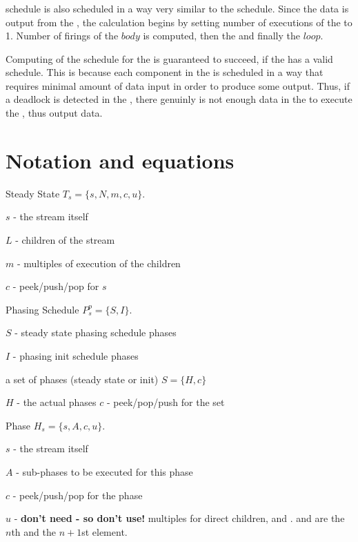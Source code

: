 \subsubsection{\feedbackloop}

{\feedbackloop} schedule is also scheduled in a way very similar to
the {\pipeline} schedule.  Since the data is output from the
{\splitter}, the calculation begins by setting number of executions
of the {\splitter} to 1.  Number of firings of the $body$ is
computed, then the {\joiner} and finally the $loop$.

Computing of the schedule for the {\feedbackloop} is guaranteed to
succeed, if the {\feedbackloop} has a valid schedule.  This is
because each component in the {\feedbackloop} is scheduled in a way
that requires minimal amount of data input in order to produce
some output.  Thus, if a deadlock is detected in the
{\feedbackloop}, there genuinly is not enough data in the
{\feedbackloop} to execute the {\splitter}, thus output data.

\section{Notation and equations}

Steady State $T_s = \{s, N, m, c, u\}$.
\begin{itemize}
\myitem $s$ - the stream itself

\myitem $L$ - children of the stream

\myitem $m$ - multiples of execution of the children

\myitem $c$ - peek/push/pop for $s$
\end{itemize}

\noindent Phasing Schedule $P^p_s = \{S, I\}$.
\begin{itemize}
\myitem $S$ - steady state phasing schedule phases

\myitem $I$ - phasing init schedule phases
\end{itemize}

\noindent a set of phases (steady state or init) $S = \{H, c\}$
\begin{itemize}
\myitem $H$ - the actual phases \myitem $c$ - peek/pop/push for
the set
\end{itemize}

\noindent Phase $H_s = \{s, A, c, u\}$.
\begin{itemize}
\myitem $s$ - the stream itself

\myitem $A$ - sub-phases to be executed for this phase

\myitem $c$ - peek/push/pop for the phase

\myitem $u$ - {\bf don't need - so don't use!} multiples for
direct children, {\splitter} and {\joiner}.  {\splitter} and {\joiner} are
the $n$th and the $n+1$st element.
\end{itemize}

